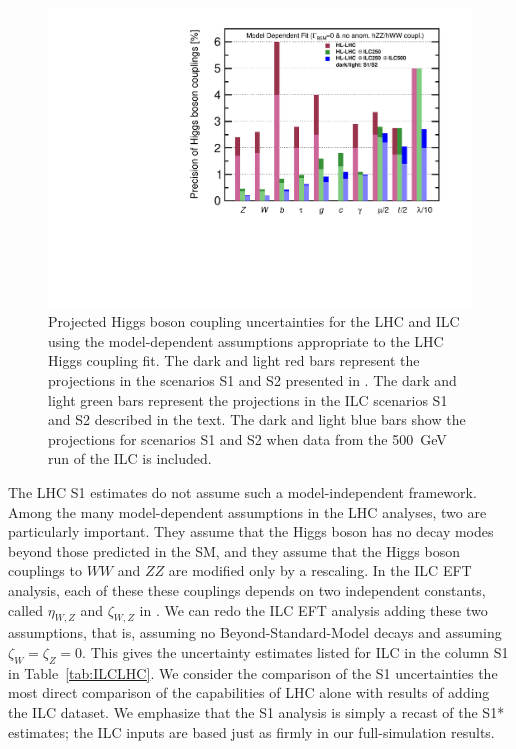 \begin{figure}
\begin{center}
\includegraphics[width=0.7\hsize]{chapters/figures/ModeldepSummary.pdf}
\caption{Projected Higgs boson coupling uncertainties for the LHC and
  ILC
using the model-dependent assumptions appropriate to the LHC Higgs
coupling fit.   The
dark and light red bars represent the projections in the scenarios S1
and S2 presented in  \cite{YR}.    The dark and light green bars represent the
projections in the ILC scenarios S1 and S2 described in the
text.  The dark and light blue bars show the projections for scenarios S1 and S2
when
data from the 500~GeV run of the ILC is included.}
 \label{fig:ILCLHC}
\end{center}
\end{figure}


The LHC S1 estimates do not assume such a model-independent framework.
Among the many model-dependent assumptions in the LHC  analyses, two are
particularly important. They  assume  that the Higgs boson has no decay
modes beyond those predicted in the SM, and they  assume that the Higgs
boson couplings to $WW$ and $ZZ$ are modified only by a rescaling.  In
the ILC EFT analysis, each of these these couplings depends on two
independent constants, called $\eta_{W,Z}$ and $\zeta_{W,Z}$ in
\cite{Barklow:2017suo}.   We can redo the ILC EFT analysis
adding these two assumptions, that is, assuming no
Beyond-Standard-Model decays and assuming $\zeta_{W} = \zeta_Z = 0$.
This gives the uncertainty estimates listed for ILC  in the column S1
in Table~\ref{tab:ILCLHC}.   We consider the comparison of the S1
uncertainties the most direct comparison of the capabilities of  LHC
alone with results of adding the ILC dataset. 
  We emphasize that the S1 analysis is 
simply a recast of the S1* estimates; the ILC inputs are based just 
as firmly in our full-simulation results.

